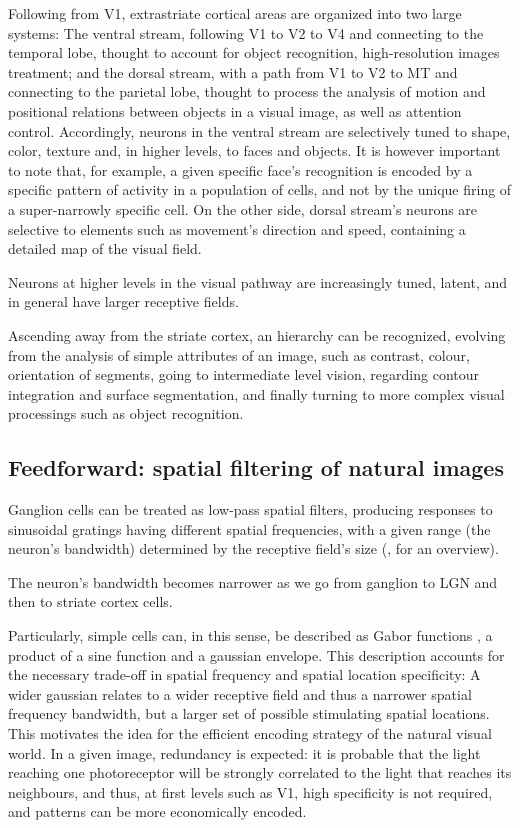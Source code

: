 Following from V1, extrastriate cortical areas are organized into two large systems: The ventral stream, following V1 to V2 to V4 and connecting to the temporal lobe, thought to account for object recognition, high-resolution images treatment; and the dorsal stream, with a path from V1 to V2 to MT and connecting to the parietal lobe, thought to process the analysis of motion and positional relations between objects in a visual image, as well as attention control. Accordingly, neurons in the ventral stream are selectively tuned to shape, color, texture and, in higher levels, to faces and objects. It is however important to note that, for example, a given specific face's recognition is encoded by a specific pattern of activity in a population of cells, and not by the unique firing of a super-narrowly specific cell. On the other side, dorsal stream's neurons are selective to elements such as movement's direction and speed, containing a detailed map of the visual field.

Neurons at higher levels in the visual pathway are increasingly tuned, latent, and in general have larger receptive fields.

Ascending away from the striate cortex, an hierarchy can be recognized, evolving from the analysis of simple attributes of an image, such as contrast, colour, orientation of segments, going to intermediate level vision, regarding contour integration and surface segmentation, and finally turning to more complex visual processings such as object recognition. 


\subsection{Feedforward: spatial filtering of natural images}

Ganglion cells can be treated as low-pass spatial filters, producing responses to sinusoidal gratings having different spatial frequencies, with a given range (the neuron's bandwidth) determined by the receptive field's size (\cite{Green}, for an overview). 

The neuron's bandwidth becomes narrower as we go from ganglion to LGN and then to striate cortex cells. 

Particularly, simple cells can, in this sense, be described as Gabor functions \cite{Jones1987}, a product of a sine function and a gaussian envelope. This description accounts for the necessary trade-off in spatial frequency and spatial location specificity: A wider gaussian relates to a wider receptive field and thus a narrower spatial frequency bandwidth, but a larger set of possible stimulating spatial locations. This motivates the idea for the efficient encoding strategy of the natural visual world. In a given image, redundancy is expected: it is probable that the light reaching one photoreceptor will be strongly correlated to the light that reaches its neighbours, and thus, at first levels such as V1, high specificity is not required, and patterns can be more economically encoded.

